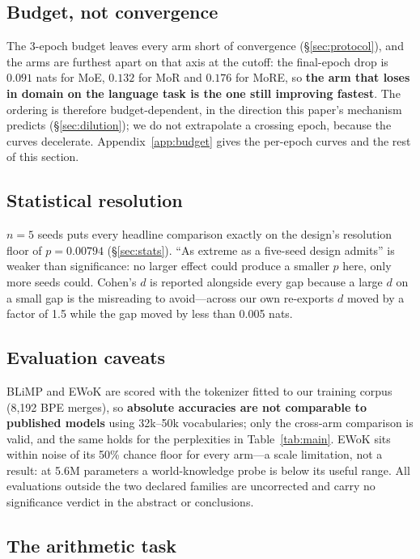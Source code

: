 \subsection{Budget, not convergence}\label{sec:budget} The 3-epoch budget leaves every arm short of convergence (\S\ref{sec:protocol}), and the arms are furthest apart on that axis at the cutoff: the final-epoch drop is $0.091$ nats for MoE, $0.132$ for MoR and $0.176$ for MoRE, so \textbf{the arm that loses in domain on the language task is the one still improving fastest}. The ordering is therefore budget-dependent, in the direction this paper's mechanism predicts (\S\ref{sec:dilution}); we do not extrapolate a crossing epoch, because the curves decelerate. Appendix~\ref{app:budget} gives the per-epoch curves and the rest of this section.

\subsection{Statistical resolution}

$n = 5$ seeds puts every headline comparison exactly on the design's resolution
floor of $p = 0.00794$ (\S\ref{sec:stats}). ``As extreme as a five-seed design
admits'' is weaker than significance: no larger effect could produce a smaller $p$
here, only more seeds could. Cohen's
$d$ is reported alongside every gap because a large $d$ on a small gap is the
misreading to avoid---across our own re-exports $d$ moved by a factor of 1.5 while
the gap moved by less than 0.005 nats.

\subsection{Evaluation caveats}

BLiMP and EWoK are scored with the tokenizer fitted to our training corpus
(8{,}192 BPE merges), so \textbf{absolute accuracies are not comparable to
published models} using 32k--50k vocabularies; only the cross-arm comparison is
valid, and the same holds for the perplexities in Table~\ref{tab:main}. EWoK sits
within noise of its 50\% chance floor for every arm---a scale limitation, not a
result: at 5.6M parameters a world-knowledge probe is below its useful range. All
evaluations outside the two declared families are uncorrected and carry no
significance verdict in the abstract or conclusions.

\subsection{The arithmetic task}

